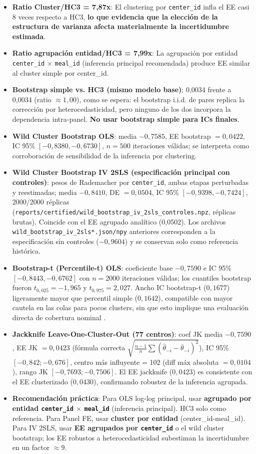 \documentclass[doc, a4paper, biblatex, floatsintext, longtable, babel]{apa7}
\begin{document}
\begin{itemize}
    \item \textbf{Ratio Cluster/HC3 = 7,87x}: El clustering por \texttt{center\_id} infla el EE casi 8 veces respecto a HC3, \textbf{lo que evidencia que la elección de la estructura de varianza afecta materialmente la incertidumbre estimada}.
    \item \textbf{Ratio agrupación entidad/HC3 = 7,99x}: La agrupación por entidad \texttt{center\_id} $\times$ \texttt{meal\_id} (inferencia principal recomendada) produce EE similar al cluster simple por center\_id.
    \item \textbf{Bootstrap simple vs. HC3 (mismo modelo base)}: 0,0034 frente a 0,0034 (ratio $\approx 1,00$), como se espera: el bootstrap i.i.d. de pares replica la corrección por heterocedasticidad, pero ninguno de los dos incorpora la dependencia intra-panel. \textbf{No usar bootstrap simple para ICs finales}.
    \item \textbf{Wild Cluster Bootstrap OLS}: media $-0,7585$, EE bootstrap $=0,0422$, IC 95\% $[-0,8380, -0,6730]$, $n=500$ iteraciones válidas; se interpreta como corroboración de sensibilidad de la inferencia por clustering.
    \item \textbf{Wild Cluster Bootstrap IV 2SLS (especificación principal con controles)}: pesos de Rademacher por \texttt{center\_id}, ambas etapas perturbadas y reestimadas; media $-0,8410$, DE $=0,0504$, IC 95\% $[-0,9398, -0,7424]$, 2000/2000 réplicas (\texttt{reports/certified/wild\_bootstrap\_iv\_2sls\_controles.npz}, réplicas brutas). Coincide con el EE agrupado analítico (0,0502). Los archivos \texttt{wild\_bootstrap\_iv\_2sls*.json/npy} anteriores corresponden a la especificación sin controles ($-0,9604$) y se conservan solo como referencia histórica.
    \item \textbf{Bootstrap-t (Percentile-t) OLS}: coeficiente base $-0,7590$ e IC 95\% $[-0,8443,-0,6762]$ con $n=2000$ iteraciones válidas; los cuantiles bootstrap fueron $t_{0,025}=-1,965$ y $t_{0,975}=2,027$. Ancho IC bootstrap-t ($0,1677$) ligeramente mayor que percentil simple ($0,1642$), compatible con mayor cautela en las colas para pocos clusters, sin que esto implique una evaluación directa de cobertura nominal \parencite{cameron2008bootstrap}.
    \item \textbf{Jackknife Leave-One-Cluster-Out (77 centros)}: coef JK media $-0,7590$, EE JK $=0,0423$ (fórmula correcta $\sqrt{\frac{n-1}{n}\sum(\hat{\theta}_{-i}-\bar{\theta}_{-i})^2}$), IC 95\% $[-0,842;-0,676]$, centro más influyente = 102 (diff máx absoluta $=0,0104$), rango JK $[-0,7693;-0,7506]$. El EE jackknife ($0,0423$) es consistente con el EE clusterizado ($0,0430$), confirmando robustez de la inferencia agrupada.
    \item \textbf{Recomendación práctica}: Para OLS log-log principal, usar \textbf{agrupado por entidad \texttt{center\_id} $\times$ \texttt{meal\_id}} (inferencia principal). HC3 solo como referencia. Para Panel FE, usar \textbf{cluster por entidad} (center\_id-meal\_id). Para IV 2SLS, usar \textbf{EE agrupados por \texttt{center\_id}} o el wild cluster bootstrap; los EE robustos a heterocedasticidad subestiman la incertidumbre en un factor $\approx 9$.
\end{itemize}
\end{document}
